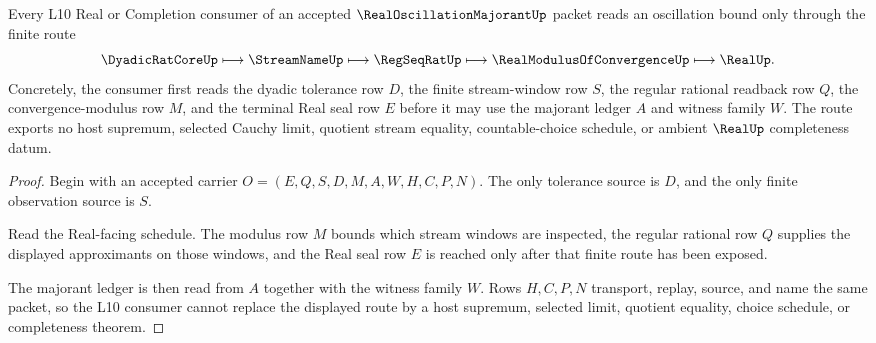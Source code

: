 \begin{theorem}
\label{thm:real-oscillation-majorant-l10-readback}
Every L10 Real or Completion consumer of an accepted $\RealOscillationMajorantUp$ packet reads an oscillation bound only through the finite route
$$
\DyadicRatCoreUp \longmapsto \StreamNameUp \longmapsto \RegSeqRatUp \longmapsto \RealModulusOfConvergenceUp \longmapsto \RealUp .
$$
Concretely, the consumer first reads the dyadic tolerance row $D$, the finite stream-window row $S$, the regular rational readback row $Q$, the convergence-modulus row $M$, and the terminal Real seal row $E$ before it may use the majorant ledger $A$ and witness family $W$. The route exports no host supremum, selected Cauchy limit, quotient stream equality, countable-choice schedule, or ambient $\RealUp$ completeness datum.
\end{theorem}
\begin{proof}
Begin with an accepted carrier $O=(E,Q,S,D,M,A,W,H,C,P,N)$. The only tolerance source is $D$, and the only finite observation source is $S$.

Read the Real-facing schedule. The modulus row $M$ bounds which stream windows are inspected, the regular rational row $Q$ supplies the displayed approximants on those windows, and the Real seal row $E$ is reached only after that finite route has been exposed.

The majorant ledger is then read from $A$ together with the witness family $W$. Rows $H,C,P,N$ transport, replay, source, and name the same packet, so the L10 consumer cannot replace the displayed route by a host supremum, selected limit, quotient equality, choice schedule, or completeness theorem.
\end{proof}


\begin{closurestatus}{\RealOscillationMajorantUp}
  \theoryclosure{\seedClosure}
  \formalstatus{\unformalizedV}
\end{closurestatus}
